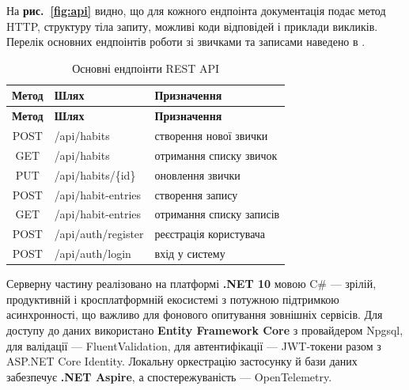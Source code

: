 
На \textbf{рис.~\ref{fig:api}} видно, що для кожного ендпоінта документація подає метод HTTP, структуру тіла запиту, можливі коди відповідей і приклади викликів. Перелік основних ендпоінтів роботи зі звичками та записами наведено в .

\needspace{6.5cm}
\begin{spacing}{1.2}
    \footnotesize
    \noindent
    \begin{xltabular}{\textwidth}{| c | >{\raggedright\arraybackslash}X | >{\raggedright\arraybackslash}X |}
        \caption{Основні ендпоінти REST API} \label{tab:api} \\
        \hline
        \textbf{Метод} & \textbf{Шлях} & \textbf{Призначення} \\ \hline
        \endfirsthead

        \hline
        \textbf{Метод} & \textbf{Шлях} & \textbf{Призначення} \\ \hline
        \endhead

        POST & /api/habits & створення нової звички \\ \hline
        GET & /api/habits & отримання списку звичок \\ \hline
        PUT & /api/habits/\{id\} & оновлення звички \\ \hline
        POST & /api/habit-entries & створення запису \\ \hline
        GET & /api/habit-entries & отримання списку записів \\ \hline
        POST & /api/auth/register & реєстрація користувача \\ \hline
        POST & /api/auth/login & вхід у систему \\ \hline
    \end{xltabular}
\end{spacing}


Серверну частину реалізовано на платформі \textbf{.NET 10} мовою C\# — зрілій, продуктивній і кросплатформній екосистемі з потужною підтримкою асинхронності, що важливо для фонового опитування зовнішніх сервісів. Для доступу до даних використано \textbf{Entity Framework Core} з провайдером Npgsql, для валідації — FluentValidation, для автентифікації — JWT-токени разом з ASP.NET Core Identity. Локальну оркестрацію застосунку й бази даних забезпечує \textbf{.NET Aspire}, а спостережуваність — OpenTelemetry.

